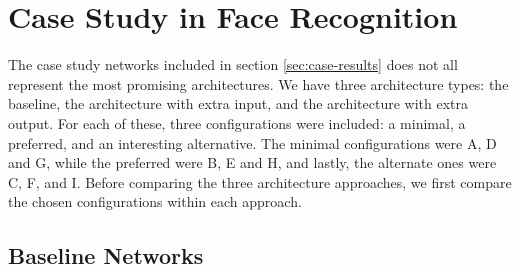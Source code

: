 

\section{Case Study in Face Recognition}

\begin{comment}
RQ 2: How can facial expression data be utilized to improve a face recognition system?

RO 2.1:Investigate what happens when incorporating expression data in a face recognition system.

order of performance, from best to worst: E, F, B, D, C, A, H, G, I
avvik i orden: test acc. er litt høyere i C enn D
avvik i orden: test og val. loss er litt lavere i A enn C
avvik i orden: test og val. loss er litt lavere i I enn G
avvik i orden: test ID acc. er litt høyere i I enn G
avvik i orden: test og val. exp. acc. er litt høyere i I enn G
avvik i orden: test og val. exp. loss er litt lavere i I enn G
avvik i orden: I har faktisk høyest exp. test acc.

for extra output: loss is high, but accuracy isnt THAT bad

The combined metrics of the extra output architecture make it harder to compare to the baseline and extra input architecture.

The extra output architecture underperforms in comparison with the other two, but still manages an impressive accuracy considering it is tackling two problems simultaneously.

comment on separated performance metrics for extra output networks
\end{comment}

The case study networks included in section \ref{sec:case-results} does not all represent the most promising architectures. We have three architecture types: the baseline, the architecture with extra input, and the architecture with extra output. For each of these, three configurations were included: a minimal, a preferred, and an interesting alternative. The minimal configurations were A, D and G, while the preferred were B, E and H, and lastly, the alternate ones were C, F, and I. Before comparing the three architecture approaches, we first compare the chosen configurations within each approach.

\subsection{Baseline Networks}

